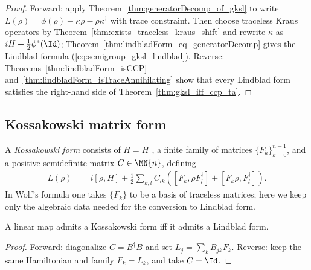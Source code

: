 \begin{proof}\leanok
    Forward: apply Theorem~\ref{thm:generatorDecomp_of_gksl} to write
    $L(\rho)=\phi(\rho)-\kappa\rho-\rho\kappa^\dagger$ with trace
    constraint. Then choose traceless Kraus operators by
    Theorem~\ref{thm:exists_traceless_kraus_shift} and rewrite $\kappa$ as
    $iH+\frac{1}{2}\phi^*(\Id)$;
    Theorem~\ref{thm:lindbladForm_eq_generatorDecomp} gives the Lindblad
    formula (\ref{eq:semigroup_gksl_lindblad}).
    Reverse: Theorems~\ref{thm:lindbladForm_isCCP}
    and~\ref{thm:lindbladForm_isTraceAnnihilating} show that every Lindblad form
    satisfies the right-hand side of Theorem~\ref{thm:gksl_iff_ccp_ta}.
\end{proof}

\subsection{Kossakowski matrix form}

\begin{definition}\label{def:kossakowski_form}
    \leanok
    A \emph{Kossakowski form} consists of $H=H^\dagger$, a finite family
    of matrices $\{F_k\}_{k=0}^{n-1}$, and a positive semidefinite matrix
    $C \in \MN{n}$, defining
    \begin{align}
        L(\rho)
        &= i[\rho,H]
        + \tfrac{1}{2}\sum_{k,l}C_{lk}
        ([F_k,\rho F_l^\dagger]+[F_k\rho,F_l^\dagger]).
        \label{eq:semigroup_kossakowski_form}
    \end{align}
    In Wolf's formula one takes $\{F_k\}$ to be a basis of traceless matrices;
    here we keep only the algebraic data needed for the conversion to
    Lindblad form.
\end{definition}

\begin{theorem}
    \label{thm:kossakowski_iff_lindblad}
    \leanok
    A linear map admits a Kossakowski form iff it admits a Lindblad form.
\end{theorem}

\begin{proof}
    \leanok
    Forward: diagonalize $C=B^\dagger B$ and set
    $L_j=\sum_k B_{jk}F_k$.
    Reverse: keep the same Hamiltonian and family $F_k=L_k$, and take
    $C=\Id$.
\end{proof}

